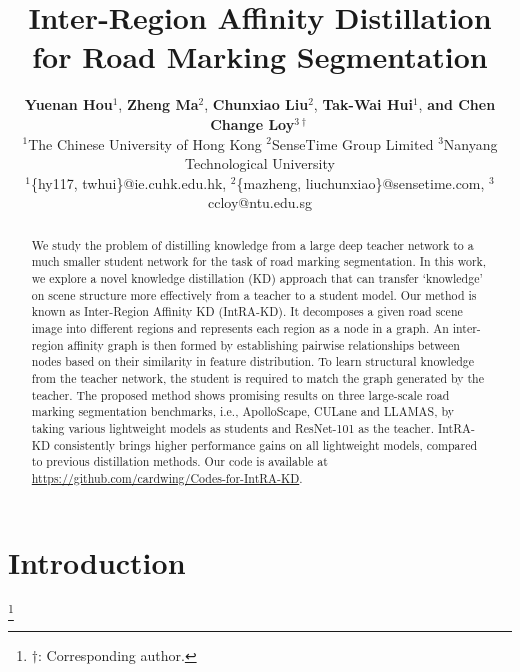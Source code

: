\documentclass[10pt,twocolumn,letterpaper]{article}
\newcommand\blfootnote[1]{\begingroup
  \renewcommand\thefootnote{}\footnote{#1}\addtocounter{footnote}{-1}\endgroup
}
\begin{document}
\title{Inter-Region Affinity Distillation for Road Marking Segmentation}

\author{\textbf{Yuenan Hou}$^{1}$, \textbf{Zheng Ma}$^{2}$, \textbf{Chunxiao Liu}$^{2}$, \textbf{Tak-Wai Hui}$^{1}$, \textbf{and Chen Change Loy}$^{3\dagger}$\\
$^{1}$The Chinese University of Hong Kong $^{2}$SenseTime Group Limited $^{3}$Nanyang Technological University\\
$^{1}$\{hy117, twhui\}@ie.cuhk.edu.hk, $^{2}$\{mazheng, liuchunxiao\}@sensetime.com, $^{3}$ccloy@ntu.edu.sg
}

\maketitle
\def\algorithmname{IntRA-KD}

\begin{abstract}


We study the problem of distilling knowledge from a large deep teacher network to a much smaller student network for the task of road marking segmentation. 
In this work, we explore a novel knowledge distillation (KD) approach that can transfer `knowledge' on scene structure more effectively from a teacher to a student model. Our method is known as Inter-Region Affinity KD (IntRA-KD). It decomposes a given road scene image into different regions and represents each region as a node in a graph. An inter-region affinity graph is then formed by establishing pairwise relationships between nodes based on their similarity in feature distribution.
To learn structural knowledge from the teacher network, the student is required to match the graph generated by the teacher.
The proposed method shows promising results on three large-scale road marking segmentation benchmarks, i.e., ApolloScape, CULane and LLAMAS, by taking various lightweight models as students and ResNet-101 as the teacher.
IntRA-KD consistently brings higher performance gains on all lightweight models, compared to previous distillation methods. Our code is available at \url{https://github.com/cardwing/Codes-for-IntRA-KD}.%
 \end{abstract}


\section{Introduction}
\label{sec:introduction}


\blfootnote{$\dagger$: Corresponding author.}
\end{document}
